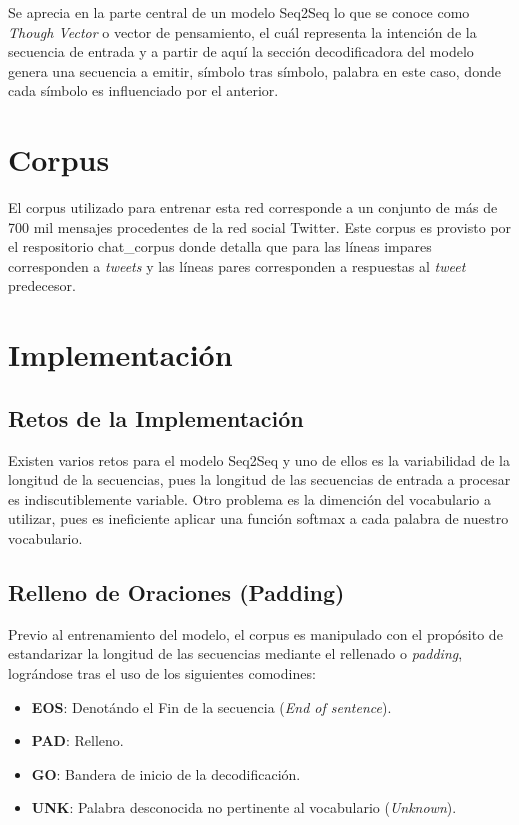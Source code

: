 \documentclass[12pt, letterpaper]{article}
\begin{document}
    Se aprecia en la parte central de un modelo Seq2Seq lo que se conoce como \emph{Though Vector} o vector de pensamiento, el cuál representa la intención de la secuencia de entrada y a partir de aquí la sección decodificadora del modelo genera una secuencia a emitir, símbolo tras símbolo, palabra en este caso, donde cada símbolo es influenciado por el anterior.

    \section{Corpus}
    El corpus utilizado para entrenar esta red corresponde a un conjunto de más de 700 mil mensajes procedentes de la red social Twitter. Este corpus es provisto por el respositorio chat\_corpus\cite{Ma_2020} donde detalla que para las líneas impares corresponden a \emph{tweets} y las líneas pares corresponden a respuestas al \emph{tweet} predecesor.

    \section{Implementación}

    \subsection{Retos de la Implementación}
    Existen varios retos para el modelo Seq2Seq y uno de ellos es la variabilidad de la longitud de la secuencias, pues la longitud de las secuencias de entrada a procesar es indiscutiblemente variable. Otro problema es la dimención del vocabulario a utilizar, pues es ineficiente aplicar una función softmax a cada palabra de nuestro vocabulario\cite{Ramamoorthy}.

    \subsection{Relleno de Oraciones (Padding)}
    Previo al entrenamiento del modelo, el corpus es manipulado con el propósito de estandarizar la longitud de las secuencias mediante el rellenado o \emph{padding}, lográndose tras el uso de los siguientes comodines:

    \begin{itemize}
        \item \textbf{EOS}: Denotándo el Fin de la secuencia (\emph{End of sentence}).
        \item \textbf{PAD}: Relleno.
        \item \textbf{GO}: Bandera de inicio de la decodificación.
        \item \textbf{UNK}: Palabra desconocida no pertinente al vocabulario (\emph{Unknown}).
    \end{itemize}
\end{document}
